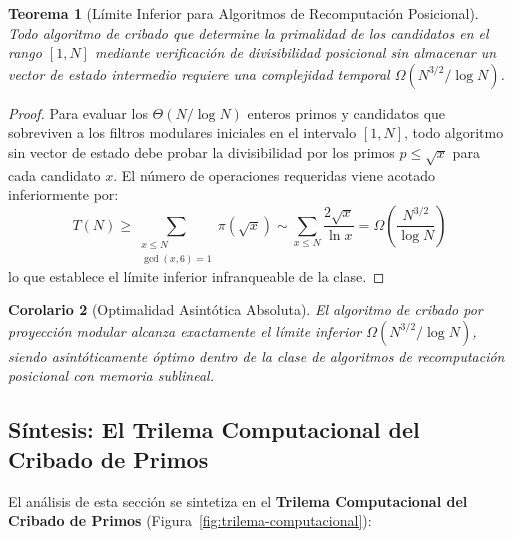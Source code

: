 \documentclass{article}
\numberwithin{equation}{section}
\theoremstyle{plain}
\newtheorem{theorem}{Teorema}[section]
\newtheorem{corollary}[theorem]{Corolario}
\theoremstyle{definition}
\begin{document}
\begin{theorem}[Límite Inferior para Algoritmos de Recomputación Posicional]
\label{thm:limite-inferior}
Todo algoritmo de cribado que determine la primalidad de los candidatos en el rango $[1, N]$ mediante verificación de divisibilidad posicional sin almacenar un vector de estado intermedio requiere una complejidad temporal $\Omega(N^{3/2}/\log N)$.
\end{theorem}

\begin{proof}
Para evaluar los $\Theta(N/\log N)$ enteros primos y candidatos que sobreviven a los filtros modulares iniciales en el intervalo $[1, N]$, todo algoritmo sin vector de estado debe probar la divisibilidad por los primos $p \le \sqrt{x}$ para cada candidato $x$. El número de operaciones requeridas viene acotado inferiormente por:
\begin{equation}
T(N) \ge \sum_{\substack{x \le N \\ \gcd(x,6)=1}} \pi(\sqrt{x}) \sim \sum_{x \le N} \frac{2\sqrt{x}}{\ln x} = \Omega\left(\frac{N^{3/2}}{\log N}\right)
\end{equation}
lo que establece el límite inferior infranqueable de la clase.
\end{proof}

\begin{corollary}[Optimalidad Asintótica Absoluta]
\label{cor:optimalidad-asintotica}
El algoritmo de cribado por proyección modular alcanza exactamente el límite inferior $\Omega(N^{3/2}/\log N)$, siendo asintóticamente óptimo dentro de la clase de algoritmos de recomputación posicional con memoria sublineal.
\end{corollary}

\subsection{Síntesis: El Trilema Computacional del Cribado de Primos}

El análisis de esta sección se sintetiza en el \textbf{Trilema Computacional del Cribado de Primos} (Figura~\ref{fig:trilema-computacional}):
\end{document}

